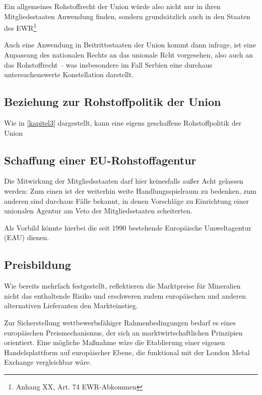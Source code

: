 \documentclass[12pt,a4paper,oneside]{book} %
\begin{document}
Ein allgemeines Rohstoffrecht der Union würde also nicht nur in ihren Mitgliedsstaaten Anwendung finden, sondern grundsätzlich auch in den Staaten des EWR\footnote{Anhang XX, Art. 74 EWR-Abkommen}


Auch eine Anwendung in Beitrittsstaaten der Union kommt dann infrage, ist eine Anpassung des nationalen Rechts an das unionale Rcht vorgesehen, also auch an das Rohstoffrecht -- was insbesondere im Fall Serbien eine durchaus untersuchenswerte Konstellation darstellt.

\subsection{Beziehung zur Rohstoffpolitik der Union}
Wie in \ref{kapitel3} dargestellt, kann eine eigens geschaffene Rohstoffpolitik der Union 

\subsection{Schaffung einer EU-Rohstoffagentur}

Die Mitwirkung der Mitgliedsstaaten darf hier keinesfalls außer Acht gelassen werden: Zum einen ist der weiterhin weite Handlungsspielraum zu bedenken, zum anderen sind durchaus Fälle bekannt, in denen Vorschläge zu Einrichtung einer unionalen Agentur am Veto der Mitgliedsstaaten scheiterten.\autocite[im konkreten Fall ging es um die Einführung einer EU-Agentur zur Kontrolle der Umsetzung des EU-Abfallrechts]{Dauses/Ludwigs, O. Umweltpolitik Rn. 226; Europäische Kommission: Study on the feasibility of the establishment of a Waste Implementation Agency}

Als Vorbild könnte hierbei die seit 1990 bestehende Europäische Umweltagentur (EAU) dienen.

\subsection{Preisbildung}
Wie bereits mehrfach festgestellt, reflektieren die Marktpreise für Mineralien nicht das enthaltende Risiko und erschweren zudem europäischen und anderen alternativen Lieferanten den Markteinstieg.

Zur Sicherstellung wettbewerbsfähiger Rahmenbedingungen bedarf es eines europäischen Preismechanismus, der sich an marktwirtschaftlichen Prinzipien orientiert. Eine mögliche Maßnahme wäre die Etablierung einer eigenen Handelsplattform auf europäischer Ebene, die funktional mit der London Metal Exchange vergleichbar wäre.
\end{document}
